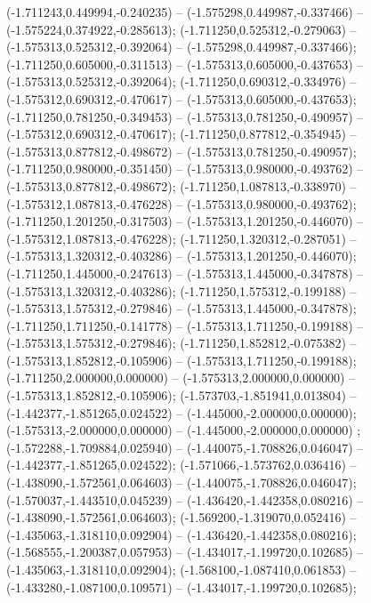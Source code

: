  (-1.711243,0.449994,-0.240235) -- (-1.575298,0.449987,-0.337466) -- (-1.575224,0.374922,-0.285613);
 (-1.711250,0.525312,-0.279063) -- (-1.575313,0.525312,-0.392064) -- (-1.575298,0.449987,-0.337466);
 (-1.711250,0.605000,-0.311513) -- (-1.575313,0.605000,-0.437653) -- (-1.575313,0.525312,-0.392064);
 (-1.711250,0.690312,-0.334976) -- (-1.575312,0.690312,-0.470617) -- (-1.575313,0.605000,-0.437653);
 (-1.711250,0.781250,-0.349453) -- (-1.575313,0.781250,-0.490957) -- (-1.575312,0.690312,-0.470617);
 (-1.711250,0.877812,-0.354945) -- (-1.575313,0.877812,-0.498672) -- (-1.575313,0.781250,-0.490957);
 (-1.711250,0.980000,-0.351450) -- (-1.575313,0.980000,-0.493762) -- (-1.575313,0.877812,-0.498672);
 (-1.711250,1.087813,-0.338970) -- (-1.575312,1.087813,-0.476228) -- (-1.575313,0.980000,-0.493762);
 (-1.711250,1.201250,-0.317503) -- (-1.575313,1.201250,-0.446070) -- (-1.575312,1.087813,-0.476228);
 (-1.711250,1.320312,-0.287051) -- (-1.575313,1.320312,-0.403286) -- (-1.575313,1.201250,-0.446070);
 (-1.711250,1.445000,-0.247613) -- (-1.575313,1.445000,-0.347878) -- (-1.575313,1.320312,-0.403286);
 (-1.711250,1.575312,-0.199188) -- (-1.575313,1.575312,-0.279846) -- (-1.575313,1.445000,-0.347878);
 (-1.711250,1.711250,-0.141778) -- (-1.575313,1.711250,-0.199188) -- (-1.575313,1.575312,-0.279846);
 (-1.711250,1.852812,-0.075382) -- (-1.575313,1.852812,-0.105906) -- (-1.575313,1.711250,-0.199188);
 (-1.711250,2.000000,0.000000) -- (-1.575313,2.000000,0.000000) -- (-1.575313,1.852812,-0.105906);
 (-1.573703,-1.851941,0.013804) -- (-1.442377,-1.851265,0.024522) -- (-1.445000,-2.000000,0.000000);
 (-1.575313,-2.000000,0.000000) -- (-1.445000,-2.000000,0.000000) ;
 (-1.572288,-1.709884,0.025940) -- (-1.440075,-1.708826,0.046047) -- (-1.442377,-1.851265,0.024522);
 (-1.571066,-1.573762,0.036416) -- (-1.438090,-1.572561,0.064603) -- (-1.440075,-1.708826,0.046047);
 (-1.570037,-1.443510,0.045239) -- (-1.436420,-1.442358,0.080216) -- (-1.438090,-1.572561,0.064603);
 (-1.569200,-1.319070,0.052416) -- (-1.435063,-1.318110,0.092904) -- (-1.436420,-1.442358,0.080216);
 (-1.568555,-1.200387,0.057953) -- (-1.434017,-1.199720,0.102685) -- (-1.435063,-1.318110,0.092904);
 (-1.568100,-1.087410,0.061853) -- (-1.433280,-1.087100,0.109571) -- (-1.434017,-1.199720,0.102685);
